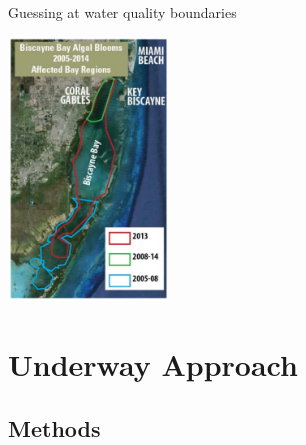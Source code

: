 \documentclass[compress,noflama,nosectionpages]{beamer}
\begin{document}
\begin{frame}{Guessing at water quality boundaries}
	\vspace{-1em}
	\begin{center}
		\includegraphics[height=7cm,keepaspectratio=true,clip=TRUE,trim=0mm 0mm 0mm -2mm]{images/flseagrant_biscayne-blooms.png}
	\end{center}
	\tiny{}
\end{frame}

\section{Underway Approach}
\subsection{Methods}
\end{document}
